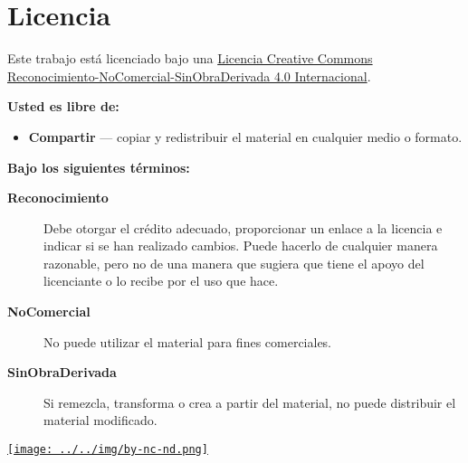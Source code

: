 \section*{Licencia}

Este trabajo está licenciado bajo una 
\href{https://creativecommons.org/licenses/by-nc-nd/4.0/}{Licencia Creative Commons Reconocimiento-NoComercial-SinObraDerivada 4.0 Internacional}.

\bigskip

\textbf{Usted es libre de:}
\begin{itemize}
  \item \textbf{Compartir} — copiar y redistribuir el material en cualquier medio o formato.
\end{itemize}

\bigskip

\textbf{Bajo los siguientes términos:}
\begin{description}
  \item[\textbf{Reconocimiento}] Debe otorgar el crédito adecuado, proporcionar un enlace a la licencia e indicar si se han realizado cambios. Puede hacerlo de cualquier manera razonable, pero no de una manera que sugiera que tiene el apoyo del licenciante o lo recibe por el uso que hace.

  \item[\textbf{NoComercial}] No puede utilizar el material para fines comerciales.

  \item[\textbf{SinObraDerivada}] Si remezcla, transforma o crea a partir del material, no puede distribuir el material modificado.
\end{description}

\bigskip

\begin{center}
  \href{https://creativecommons.org/licenses/by-nc-nd/4.0/}{\texttt{[image: ../../img/by-nc-nd.png]}}
\end{center}
